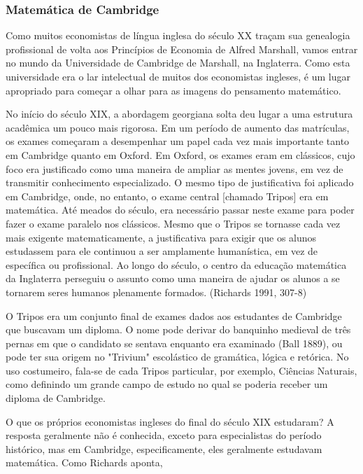 \documentclass[12pt]{article}
\begin{document}
\subsubsection{\textbf{Matemática de Cambridge}}

Como muitos economistas de língua inglesa do século XX traçam sua genealogia profissional de volta aos Princípios de Economia de Alfred Marshall, vamos entrar no mundo da Universidade de Cambridge de Marshall, na Inglaterra. Como esta universidade era o lar intelectual de muitos dos economistas ingleses, é um lugar apropriado para começar a olhar para as imagens do pensamento matemático.

No início do século XIX, a abordagem georgiana solta deu lugar a uma estrutura acadêmica um pouco mais rigorosa. Em um período de aumento das matrículas, os exames começaram a desempenhar um papel cada vez mais importante tanto em Cambridge quanto em Oxford. Em Oxford, os exames eram em clássicos, cujo foco era justificado como uma maneira de ampliar as mentes jovens, em vez de transmitir conhecimento especializado. O mesmo tipo de justificativa foi aplicado em Cambridge, onde, no entanto, o exame central [chamado Tripos] era em matemática. Até meados do século, era necessário passar neste exame para poder fazer o exame paralelo nos clássicos. Mesmo que o Tripos se tornasse cada vez mais exigente matematicamente, a justificativa para exigir que os alunos estudassem para ele continuou a ser amplamente humanística, em vez de específica ou profissional. Ao longo do século, o centro da educação matemática da Inglaterra perseguiu o assunto como uma maneira de ajudar os alunos a se tornarem seres humanos plenamente formados. (Richards 1991, 307-8)

O Tripos era um conjunto final de exames dados aos estudantes de Cambridge que buscavam um diploma. O nome pode derivar do banquinho medieval de três pernas em que o candidato se sentava enquanto era examinado (Ball 1889), ou pode ter sua origem no "Trivium" escolástico de gramática, lógica e retórica. No uso costumeiro, fala-se de cada Tripos particular, por exemplo, Ciências Naturais, como definindo um grande campo de estudo no qual se poderia receber um diploma de Cambridge.

O que os próprios economistas ingleses do final do século XIX estudaram? A resposta geralmente não é conhecida, exceto para especialistas do período histórico, mas em Cambridge, especificamente, eles geralmente estudavam matemática. Como Richards aponta,
\end{document}
